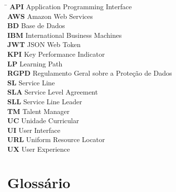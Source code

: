 \documentclass[12pt,a4paper]{report}
\begin{document}
\begin{tabbing}
  \hspace{3cm}\= \kill
  \textbf{API}  \> Application Programming Interface \\[4pt]
  \textbf{AWS}  \> Amazon Web Services \\[4pt]
  \textbf{BD}   \> Base de Dados \\[4pt]
  \textbf{IBM}  \> International Business Machines \\[4pt]
  \textbf{JWT}  \> JSON Web Token \\[4pt]
  \textbf{KPI}  \> Key Performance Indicator \\[4pt]
  \textbf{LP}   \> Learning Path \\[4pt]
  \textbf{RGPD} \> Regulamento Geral sobre a Proteção de Dados \\[4pt]
  \textbf{SL}   \> Service Line \\[4pt]
  \textbf{SLA}  \> Service Level Agreement \\[4pt]
  \textbf{SLL}  \> Service Line Leader \\[4pt]
  \textbf{TM}   \> Talent Manager \\[4pt]
  \textbf{UC}   \> Unidade Curricular \\[4pt]
  \textbf{UI}   \> User Interface \\[4pt]
  \textbf{URL}  \> Uniform Resource Locator \\[4pt]
  \textbf{UX}   \> User Experience \\
\end{tabbing}

\newpage

\chapter*{Glossário}
\end{document}
